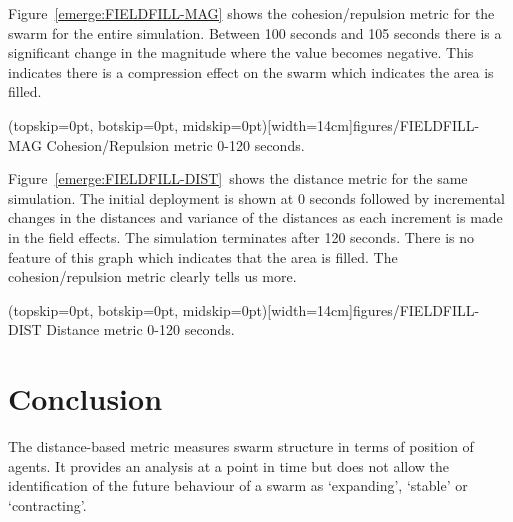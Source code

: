 \documentclass{ieeeaccess}
\begin{document}
Figure~\ref{emerge:FIELDFILL-MAG} shows the cohesion/repulsion metric for the swarm for the entire simulation. Between 100 seconds and 105 seconds there is a significant change in the magnitude where the value becomes negative. This indicates there is a compression effect on the swarm which indicates the area is filled.

\Figure[t!](topskip=0pt, botskip=0pt, midskip=0pt)[width=14cm]{figures/FIELDFILL-MAG}
{Cohesion/Repulsion metric 0-120 seconds.\label{emerge:FIELDFILL-MAG}}


Figure~\ref{emerge:FIELDFILL-DIST}~shows the distance metric for the same simulation. The initial deployment is shown at 0 seconds followed by incremental changes in the distances and variance of the distances as each increment is made in the field effects. The simulation terminates after 120 seconds. There is no feature of this graph which indicates that the area is filled. The cohesion/repulsion metric clearly tells us more. 

\Figure[t!](topskip=0pt, botskip=0pt, midskip=0pt)[width=14cm]{figures/FIELDFILL-DIST}
{Distance metric 0-120 seconds.\label{emerge:FIELDFILL-DIST}}


\section{Conclusion}\label{Section:MagnitudeDistanceComparison}
The distance-based metric measures swarm structure in terms of position of agents. It provides an analysis at a point in time but does not allow the identification of the future behaviour of a swarm as `expanding', `stable' or `contracting'. 
\end{document}
